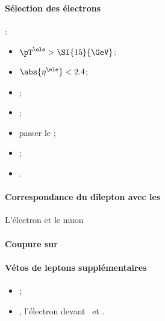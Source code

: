 \paragraph{Sélection des électrons}
:
\begin{itemize}
    \item $\pT^{\ele} > \SI{15}{\GeV}$;
    \item $\abs{\eta^{\ele}} < 2.4$;
    \item \Leptondzdxy;
    \item {};
    \item passer le \NinetyNineEleMVAnoIso;
    \item \LessTwoMissingHitsVertex;
    \item \PassConversionVeto.
\end{itemize}
\paragraph{Correspondance du dilepton avec les \HLTpaths}
L'électron et le muon \FromPairMatchToHLTObjects{}

\paragraph{Coupure sur \Dzeta}
\DzetaEleMU
\paragraph{Vétos de leptons supplémentaires}
\LeptonVetoes
\begin{itemize}
    \item \LeptonVetoesSecondMuon;
    \item \LeptonVetoesSecondEle, l'électron devant \PassConversionVeto\ et \LessTwoMissingHitsVertex.
\end{itemize}